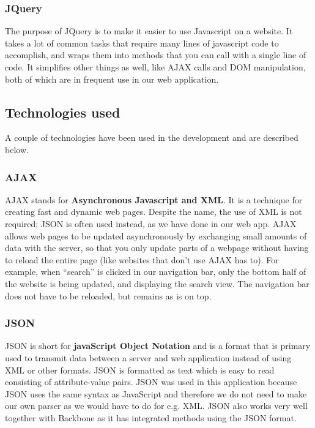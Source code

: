 \subsubsection{JQuery}
The purpose of JQuery\cite{web_6} is to make it easier to use Javascript on a website. It takes a lot of common tasks that require many lines of javascript code to accomplish, and wraps them into methods that you can call with a single line of code. It simplifies other things as well, like AJAX calls and DOM manipulation, both of which are in frequent use in our web application.


\subsection{Technologies used}
A couple of technologies have been used in the development and are described below.

\subsubsection{AJAX}
AJAX\cite{web_3} stands for \textbf{Asynchronous Javascript and XML}. It is a technique for creating fast and dynamic web pages. Despite the name, the use of XML is not required; JSON is often used instead, as we have done in our web app. AJAX allows web pages to be updated asynchronously by exchanging small amounts of data with the server, so that you only update parts of a webpage without having to reload the entire page (like websites that don’t use AJAX has to). For example, when “search” is clicked in our navigation bar, only the bottom half of the website is being updated, and displaying the search view. The navigation bar does not have to be reloaded, but remains as is on top.

\subsubsection{JSON}
JSON\cite{web_4} is short for \textbf{javaScript Object Notation} and is a format that is primary used to transmit data between a server and web application instead of using XML or other formats.
JSON is formatted as text which is easy to read consisting of attribute-value pairs.
JSON was used in this application because JSON uses the same syntax as JavaScript and therefore we do not need to make our own parser as we would have to do for e.g. XML. JSON also works very well together with Backbone as it has integrated methods using the JSON format.

